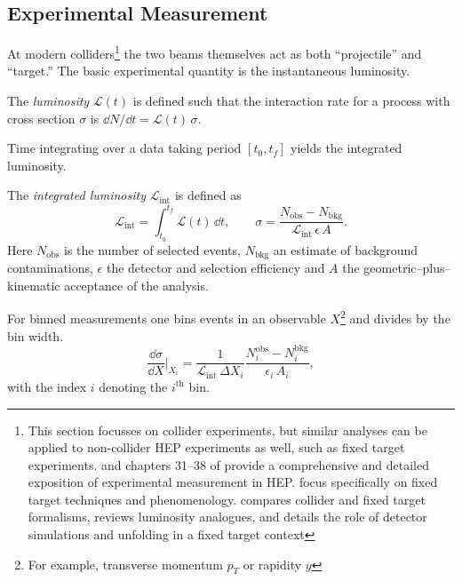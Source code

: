 \begin{definition}
    \subsection{Experimental Measurement}
    \label{subsec:exp_measurement}
        At modern colliders\footnote{
            This section focusses on collider experiments, but similar analyses can be applied to non-collider HEP experiments as well, such as fixed target experiments.
            \cite{leo_techniques_1994} and chapters \numrange{31}{38} of \cite{particle_data_group_review_2022} provide a comprehensive and detailed exposition of experimental measurement in HEP.
            \cite{Brodsky2013PhysicsBeams, AveryCrossRates} focus specifically on fixed target techniques and phenomenology.
            \cite{MuheimNuclearLaws} compares collider and fixed target formalisms, reviews luminosity analogues, and details the role of detector simulations and unfolding in a fixed target context
        } the two beams themselves act as both ``projectile'' and ``target.'' 
        The basic experimental quantity is the instantaneous luminosity.
        \begin{definition}
            The \emph{luminosity} \(\mathcal{L}(t)\) is defined such that the interaction rate for a process with cross section \(\sigma\) is \(\dd N/\dd t = \mathcal{L}(t)\,\sigma\).
        \end{definition}

        Time integrating over a data taking period \([t_0, t_f]\) yields the integrated luminosity.
        \begin{definition}
            The \emph{integrated luminosity} \(\mathcal{L}_{\text{int}}\) is defined as
            \begin{equation}
                \mathcal{L}_{\text{int}}
                = \int_{t_0}^{t_f} \mathcal{L}(t)\,\dd t,
                \qquad
                \sigma
                = \frac{N_{\text{obs}} - N_{\text{bkg}}}
                       {\mathcal{L}_{\text{int}}\,\epsilon\,A}.
                \label{eq:crossec_collider}
              \end{equation}
              Here \(N_{\text{obs}}\) is the number of selected events, \(N_{\text{bkg}}\) an estimate of background contaminations, \(\epsilon\) the detector and selection efficiency and \(A\) the geometric--plus--kinematic acceptance of the analysis.
        \end{definition}


        For binned measurements one bins events in an observable \(X\)\footnote{For example, transverse momentum \(p_T\) or rapidity \(y\)} and divides by the bin width.
        \begin{equation}
          \frac{\dd\sigma}{\dd X}\Big|_{X_i}
          = \frac{1}{\mathcal{L}_{\text{int}}\,\Delta X_i}
            \frac{N_i^{\text{obs}} - N_i^{\text{bkg}}}
                 {\epsilon_i\,A_i},
          \label{eq:diff_crossec_collider}
        \end{equation}
        with the index \(i\) denoting the \(i^{\text{th}}\) bin.


\end{definition}
